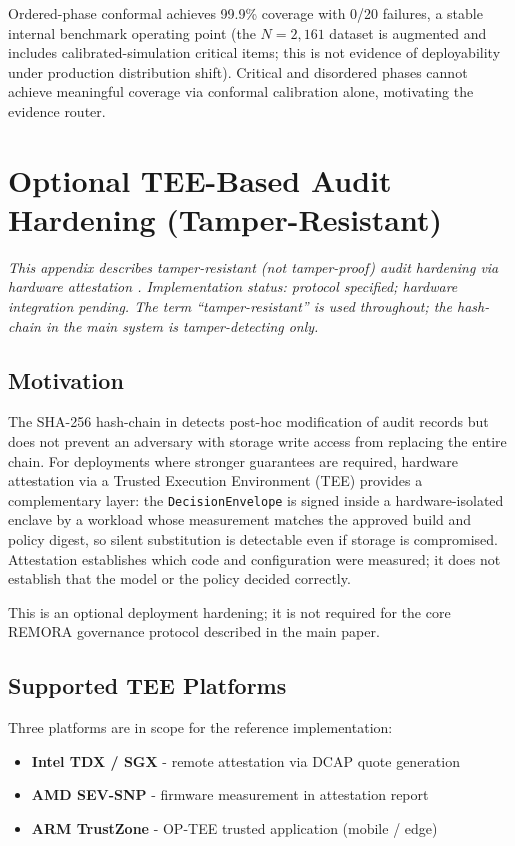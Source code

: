 \documentclass[10pt,twocolumn]{article}
\begin{document}
Ordered-phase conformal achieves 99.9\% coverage with 0/20 failures, a
stable internal benchmark operating point (the $N=2{,}161$ dataset is
augmented and includes calibrated-simulation critical items; this is not
evidence of deployability under production distribution shift).
Critical and disordered phases cannot achieve
meaningful coverage via conformal calibration alone, motivating the
evidence router.

\section{Optional TEE-Based Audit Hardening (Tamper-Resistant)}
\label{app:tee}

\emph{This appendix describes tamper-resistant (not tamper-proof) audit hardening
via hardware attestation \cite{dong2025tee}. Implementation status: protocol specified; hardware
integration pending. The term ``tamper-resistant'' is used throughout; the
hash-chain in the main system is tamper-detecting only.}

\subsection{Motivation}

The SHA-256 hash-chain in  detects
post-hoc modification of audit records but does not prevent an adversary with
storage write access from replacing the entire chain. For deployments where
stronger guarantees are required, hardware attestation via a Trusted Execution
Environment (TEE) provides a complementary layer: the \texttt{DecisionEnvelope}
is signed inside a hardware-isolated enclave by a workload whose measurement
matches the approved build and policy digest, so silent substitution is
detectable even if storage is compromised. Attestation establishes which
code and configuration were measured; it does not establish that the model
or the policy decided correctly.

This is an optional deployment hardening; it is not required for the core
REMORA governance protocol described in the main paper.

\subsection{Supported TEE Platforms}

Three platforms are in scope for the reference implementation:
\begin{itemize}
  \item \textbf{Intel TDX / SGX} - remote attestation via DCAP quote generation
  \item \textbf{AMD SEV-SNP} - firmware measurement in attestation report
  \item \textbf{ARM TrustZone} - OP-TEE trusted application (mobile / edge)
\end{itemize}
\end{document}
